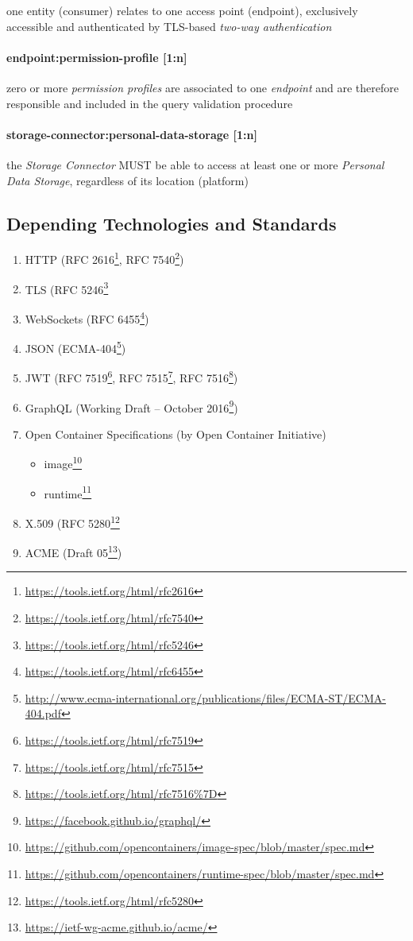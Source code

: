\documentclass[12pt,english,a4paper,titlepage,cleardoublepage=empty,dottedtoc]{report}
\renewcommand{\href}[2]{#2\footnote{\url{#1}}}
\providecommand{\tightlist}{%
  \setlength{\itemsep}{0pt}\setlength{\parskip}{0pt}}
\begin{document}
one entity (consumer) relates to one access point (endpoint),
exclusively accessible and authenticated by TLS-based \emph{two-way
authentication}

\paragraph{endpoint:permission-profile
{[}1:n{]}}\label{endpointpermission-profile-1n}

zero or more \emph{permission profiles} are associated to one
\emph{endpoint} and are therefore responsible and included in the query
validation procedure

\paragraph{storage-connector:personal-data-storage
{[}1:n{]}}\label{storage-connectorpersonal-data-storage-1n}

the \emph{Storage Connector} MUST be able to access at least one or more
\emph{Personal Data Storage}, regardless of its location (platform)

\subsection*{Depending Technologies and
Standards}\label{depending-technologies-and-standards}

\begin{enumerate}
\def\labelenumi{\alph{enumi})}
\tightlist
\item
  HTTP (\href{https://tools.ietf.org/html/rfc2616}{RFC 2616},
  \href{https://tools.ietf.org/html/rfc7540}{RFC 7540})
\item
  TLS (\href{https://tools.ietf.org/html/rfc5246}{RFC 5246}
\item
  WebSockets (\href{https://tools.ietf.org/html/rfc6455}{RFC 6455})
\item
  JSON
  (\href{http://www.ecma-international.org/publications/files/ECMA-ST/ECMA-404.pdf}{ECMA-404})
\item
  JWT (\href{https://tools.ietf.org/html/rfc7519}{RFC 7519},
  \href{https://tools.ietf.org/html/rfc7515}{RFC 7515},
  \href{https://tools.ietf.org/html/rfc7516\%7D}{RFC 7516})
\item
  GraphQL (\href{https://facebook.github.io/graphql/}{Working Draft --
  October 2016})
\item
  Open Container Specifications (by Open Container Initiative)

  \begin{itemize}
  \tightlist
  \item
    \href{https://github.com/opencontainers/image-spec/blob/master/spec.md}{image}
  \item
    \href{https://github.com/opencontainers/runtime-spec/blob/master/spec.md}{runtime}
  \end{itemize}
\item
  X.509 (\href{https://tools.ietf.org/html/rfc5280}{RFC 5280}
\item
  ACME (\href{https://ietf-wg-acme.github.io/acme/}{Draft 05})
\end{enumerate}
\end{document}

